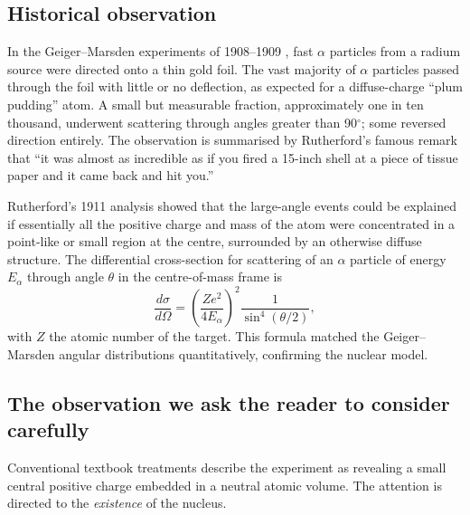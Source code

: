 \documentclass[11pt,twocolumn,a4paper]{article}
\theoremstyle{axiomstyle}
\theoremstyle{conseqstyle}
\theoremstyle{definition}
\theoremstyle{remark}
\begin{document}
\subsection{Historical observation}

In the Geiger--Marsden experiments of 1908--1909 \citep{geigermarsden1909}, fast $\alpha$ particles from a radium source were directed onto a thin gold foil. The vast majority of $\alpha$ particles passed through the foil with little or no deflection, as expected for a diffuse-charge ``plum pudding'' atom. A small but measurable fraction, approximately one in ten thousand, underwent scattering through angles greater than 90$^{\circ}$; some reversed direction entirely. The observation is summarised by Rutherford's famous remark that ``it was almost as incredible as if you fired a 15-inch shell at a piece of tissue paper and it came back and hit you.''

Rutherford's 1911 analysis \citep{rutherford1911} showed that the large-angle events could be explained if essentially all the positive charge and mass of the atom were concentrated in a point-like or small region at the centre, surrounded by an otherwise diffuse structure. The differential cross-section for scattering of an $\alpha$ particle of energy $E_{\alpha}$ through angle $\theta$ in the centre-of-mass frame is
\begin{equation}
\frac{d\sigma}{d\Omega}=\left(\frac{Ze^{2}}{4E_{\alpha}}\right)^{2}\frac{1}{\sin^{4}(\theta/2)},
\label{eq:rutherfordsigma}
\end{equation}
with $Z$ the atomic number of the target. This formula matched the Geiger--Marsden angular distributions quantitatively, confirming the nuclear model.

\subsection{The observation we ask the reader to consider carefully}

Conventional textbook treatments describe the experiment as revealing a small central positive charge embedded in a neutral atomic volume. The attention is directed to the \emph{existence} of the nucleus.
\end{document}
